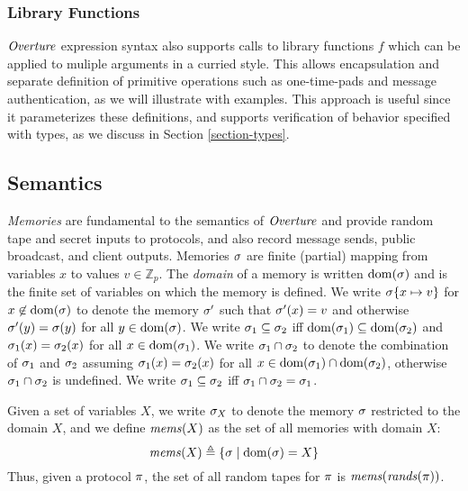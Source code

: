 \subsubsection{Library Functions} $\mathit{Overture}$ expression syntax also supports
calls to library functions $f$ which can be applied to muliple arguments in a
curried style. This allows encapsulation and separate
definition of primitive operations such as one-time-pads and message
authentication, as we will illustrate with examples. This approach is
useful since it parameterizes these definitions, and 
supports verification of behavior specified with types, as we
discuss in Section \ref{section-types}.

\subsection{Semantics}

\emph{Memories} are fundamental to the semantics of $\mathit{Overture}$ and
provide random tape and secret inputs to protocols, and also record
message sends, public broadcast, and client outputs. Memories $\sigma$ are finite
(partial) mapping from variables $x$ to values $v \in \mathbb{Z}_p$. The \emph{domain} of a
memory is written $\mathrm{dom}(\sigma)$ and is the finite set of variables on
which the memory is defined. We write $\sigma\{ x \mapsto v\}$ for
$x\not\in\mathrm{dom}(\sigma)$ to denote the memory $\sigma'$ such that
$\sigma'(x) = v$ and otherwise $\sigma'(y) = \sigma(y)$ for all $y
\in \mathrm{dom}(\sigma)$. We write $\sigma_1 \subseteq \sigma_2$ iff
$\mathrm{dom}(\sigma_1) \subseteq \mathrm{dom}(\sigma_2)$ and $\sigma_1(x) =
\sigma_2(x)$ for all $x \in \mathrm{dom}(\sigma_1)$. We write $\sigma_1 \cap
\sigma_2$ to denote the combination of $\sigma_1$ and $\sigma_2$
assuming $\sigma_1(x) = \sigma_2(x)$ for all $x \in \mathrm{dom}(\sigma_1)
\cap \mathrm{dom}(\sigma_2)$, otherwise $\sigma_1 \cap \sigma_2$ is undefined.
We write $\sigma_1 \subseteq \sigma_2$ iff $\sigma_1 \cap \sigma_2
= \sigma_1$.

Given a set of variables $X$, we write $\sigma_X$ to denote the
memory $\sigma$ restricted to the domain $X$, and we define
$\mathit{mems}(X)$ as the set of all memories with domain $X$:
$$
\mathit{mems}(X) \triangleq \{ \sigma \mid \mathrm{dom}(\sigma) = X \}
$$
Thus, given a protocol $\pi$, the set of all random tapes for
$\pi$ is $\mathit{mems}(\mathit{rands}(\pi))$.


